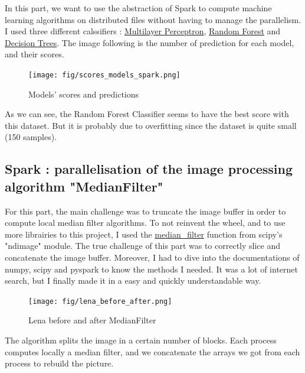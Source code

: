 \documentclass[10pt,twocolumn,letterpaper]{article}
\begin{document}
    In this part, we want to use the abstraction of Spark to compute machine
learning algorithms on distributed files without having to manage the
parallelism. I used three different calssifiers : 
\href{https://spark.apache.org/docs/latest/ml-classification-regression.html#multilayer-perceptron-classifier}{Multilayer Perceptron},
\href{https://spark.apache.org/docs/latest/ml-classification-regression.html#random-forest-classifier}{Random Forest}
and \href{https://spark.apache.org/docs/latest/ml-classification-regression.html#decision-tree-classifier}{Decision Trees}.
The image following is the number of prediction for each model, and their
scores.

\begin{figure}[H]
    \centering
    \caption{Models' scores and predictions}
    \texttt{[image: fig/scores\_models\_spark.png]}
\end{figure}

As we can see, the Random Forest Classifier seems to have the best score with
this dataset. But it is probably due to overfitting since the dataset is quite
small (150 samples).

    \subsection{Spark : parallelisation of the image processing algorithm
    "MedianFilter"}

    For this part, the main challenge was to truncate the image buffer in order
to compute local median filter algorithms. To not reinvent the wheel, and to use
more librairies to this project, I used the 
\href{https://docs.scipy.org/doc/scipy/reference/generated/scipy.ndimage.median_filter.html}
{median\_filter} function from scipy's "ndimage" module. The true challenge of
this part was to correctly slice and concatenate the image buffer. Moreover, I
had to dive into the documentations of numpy, scipy and pyspark to know the
methods I needed. It was a lot of internet search, but I finally made it in a
easy and quickly understandable way.

\begin{figure}[H]
      \centering
      \caption{Lena before and after MedianFilter}
    \texttt{[image: fig/lena\_before\_after.png]}
\end{figure}

The algorithm splits the image in a certain number of blocks. Each process
computes locally a median filter, and we concatenate the arrays we got from each
process to rebuild the picture.
\end{document}
